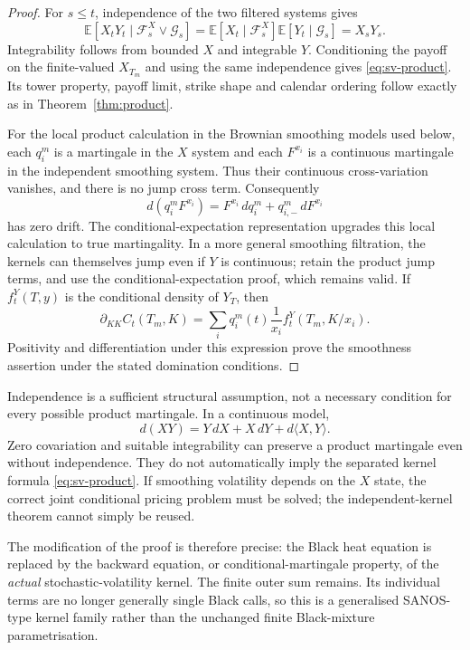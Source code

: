 \documentclass[11pt,a4paper]{article}
\numberwithin{equation}{section}
\theoremstyle{definition}\newtheorem{definition}[theorem]{Definition}
\theoremstyle{remark}\newtheorem{remark}[theorem]{Remark}
\newcommand{\E}{\mathbb E}\newcommand{\R}{\mathbb R}
\newcommand{\F}{\mathcal F}\newcommand{\G}{\mathcal G}
\begin{document}
\begin{proof}
For $s\leq t$, independence of the two filtered systems gives
\[
 \E[X_tY_t\mid\F_s^X\vee\G_s]
 =\E[X_t\mid\F_s^X]\E[Y_t\mid\G_s]=X_sY_s.
\]
Integrability follows from bounded $X$ and integrable $Y$. Conditioning the payoff on the finite-valued $X_{T_m}$ and using the same independence gives \eqref{eq:sv-product}. Its tower property, payoff limit, strike shape and calendar ordering follow exactly as in Theorem~\ref{thm:product}.

For the local product calculation in the Brownian smoothing models used below, each $q_i^m$ is a martingale in the $X$ system and each $F^{x_i}$ is a continuous martingale in the independent smoothing system. Thus their continuous cross-variation vanishes, and there is no jump cross term. Consequently
\[
 d(q_i^mF^{x_i})=F^{x_i}\,dq_i^m+q_{i,-}^m\,dF^{x_i}
\]
has zero drift. The conditional-expectation representation upgrades this local calculation to true martingality. In a more general smoothing filtration, the kernels can themselves jump even if $Y$ is continuous; retain the product jump terms, and use the conditional-expectation proof, which remains valid. If $f_t^Y(T,y)$ is the conditional density of $Y_T$, then
\begin{equation}
 \partial_{KK}C_t(T_m,K)
 =\sum_iq_i^m(t)\frac1{x_i}f_t^Y(T_m,K/x_i).
 \label{eq:sv-density}
\end{equation}
Positivity and differentiation under this expression prove the smoothness assertion under the stated domination conditions.
\end{proof}
Independence is a sufficient structural assumption, not a necessary condition for every possible product martingale. In a continuous model,
\[
 d(XY)=Y\,dX+X\,dY+d\langle X,Y\rangle.
\]
Zero covariation and suitable integrability can preserve a product martingale even without independence. They do not automatically imply the separated kernel formula \eqref{eq:sv-product}. If smoothing volatility depends on the $X$ state, the correct joint conditional pricing problem must be solved; the independent-kernel theorem cannot simply be reused.

The modification of the proof is therefore precise: the Black heat equation is replaced by the backward equation, or conditional-martingale property, of the \emph{actual} stochastic-volatility kernel. The finite outer sum remains. Its individual terms are no longer generally single Black calls, so this is a generalised SANOS-type kernel family rather than the unchanged finite Black-mixture parametrisation.
\end{document}
